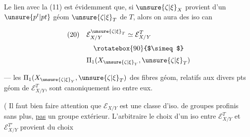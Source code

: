 
Le lien avec la  (11) est évidemment que, si $\unsure{\zeta|\xi}_X$ provient d'un $\unsure{p^t|pt}$ géom $\unsure{\zeta|\xi}_T$ de $T$, alors on aura des iso can

\[
\begin{aligned}
(20)\quad &\mathcal E_{X/Y}^{\unsure{\zeta|\xi}_T}\simeq\mathcal E_{X/Y}^T\\[0.5ex]
&\quad\rotatebox{90}{$\simeq$}\\[0.5ex]
&\Pi_1(X_{\unsure{\zeta|\xi}_Y},\unsure{\zeta|\xi}_T)
\end{aligned}
\]

 --- les $\Pi_1(X_{\unsure{\zeta|\xi}_Y},\unsure{\zeta|\xi}_T)$ des fibres géom, relatifs aux divers pts géom de $\mathcal E_{X/Y}^T$, sont canoniquement iso entre eux.

( Il faut bien faire attention que $\mathcal E_{X/Y}$  est une classe d'iso. de groupes profinis sans plus, \uline{pas} un groupe extérieur. L'arbitraire  le choix d'un iso entre $\mathcal E_{X/Y}^T$ et $\mathcal E_{X/Y}^{T'}$ provient du choix

